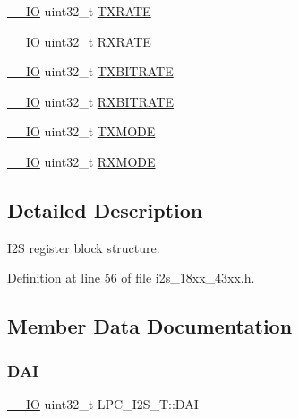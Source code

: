 \begin{DoxyCompactItemize}
\item 
\hyperlink{core__sc300_8h_aec43007d9998a0a0e01faede4133d6be}{\+\_\+\+\_\+\+IO} uint32\+\_\+t \hyperlink{struct_l_p_c___i2_s___t_ab62a8a48830412bcf4cec1b1ed5a5b21}{T\+X\+R\+A\+TE}
\item 
\hyperlink{core__sc300_8h_aec43007d9998a0a0e01faede4133d6be}{\+\_\+\+\_\+\+IO} uint32\+\_\+t \hyperlink{struct_l_p_c___i2_s___t_a03d51065fa11a182809e189b919b034a}{R\+X\+R\+A\+TE}
\item 
\hyperlink{core__sc300_8h_aec43007d9998a0a0e01faede4133d6be}{\+\_\+\+\_\+\+IO} uint32\+\_\+t \hyperlink{struct_l_p_c___i2_s___t_a16c60f11507aee3e4aef26c365a02ce2}{T\+X\+B\+I\+T\+R\+A\+TE}
\item 
\hyperlink{core__sc300_8h_aec43007d9998a0a0e01faede4133d6be}{\+\_\+\+\_\+\+IO} uint32\+\_\+t \hyperlink{struct_l_p_c___i2_s___t_a3f0c2587313eb723ac48ad06af157df9}{R\+X\+B\+I\+T\+R\+A\+TE}
\item 
\hyperlink{core__sc300_8h_aec43007d9998a0a0e01faede4133d6be}{\+\_\+\+\_\+\+IO} uint32\+\_\+t \hyperlink{struct_l_p_c___i2_s___t_a30384953ab71a349e60ed555b4ec4552}{T\+X\+M\+O\+DE}
\item 
\hyperlink{core__sc300_8h_aec43007d9998a0a0e01faede4133d6be}{\+\_\+\+\_\+\+IO} uint32\+\_\+t \hyperlink{struct_l_p_c___i2_s___t_a257e2de4bfa371adba9eeb4c2e95fe09}{R\+X\+M\+O\+DE}
\end{DoxyCompactItemize}


\subsection{Detailed Description}
I2S register block structure. 

Definition at line 56 of file i2s\+\_\+18xx\+\_\+43xx.\+h.



\subsection{Member Data Documentation}
\mbox{\label{struct_l_p_c___i2_s___t_ab94e2f49e7d70f8b19c3d74f2e67878e}} 
\subsubsection{\texorpdfstring{D\+AI}{DAI}}
{\footnotesize\ttfamily \hyperlink{core__sc300_8h_aec43007d9998a0a0e01faede4133d6be}{\+\_\+\+\_\+\+IO} uint32\+\_\+t L\+P\+C\+\_\+\+I2\+S\+\_\+\+T\+::\+D\+AI}

